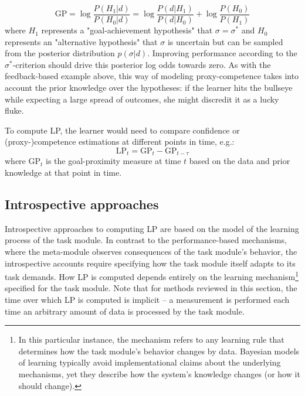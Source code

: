\begin{equation}
   \mathrm{GP} = \log \frac{P(H_1|d)}{P(H_0|d)} = \log \frac{P(d|H_1)}{P(d|H_0)} + \log \frac{P(H_0)}{P(H_1)}
\end{equation}
where $H_1$ represents a "goal-achievement hypothesis" that $\sigma = \sigma^*$ and $H_0$ represents an "alternative hypothesis" that $\sigma$ is uncertain but can be sampled from the posterior distribution $p(\sigma|d)$. Improving performance according to the $\sigma^*$-criterion should drive this posterior log odds towards zero. As with the feedback-based example above, this way of modeling proxy-competence takes into account the prior knowledge over the hypotheses: if the learner hits the bullseye while expecting a large spread of outcomes, she might discredit it as a lucky fluke. 

To compute \ac{LP}, the learner would need to compare confidence or (proxy-)competence estimations at different points in time, e.g.:
\begin{equation}
   \mathrm{LP}_t = \mathrm{GP}_{t} - \mathrm{GP}_{t-\tau}
\end{equation}
where $\mathrm{GP}_t$ is the goal-proximity measure at time $t$ based on the data and prior knowledge at that point in time.

\subsection{Introspective approaches}\label{subsec:introspective_approaches}

Introspective approaches to computing \ac{LP} are based on the model of the learning process of the task module. In contrast to the performance-based mechanisms, where the meta-module observes consequences of the task module's behavior, the introspective accounts require specifying how the task module itself adapts to its task demands. How \ac{LP} is computed depends entirely on the learning mechanism\footnote{In this particular instance, the mechanism refers to any learning rule that determines how the task module's behavior changes by data. Bayesian models of learning typically avoid implementational claims about the underlying mechanisms, yet they describe how the system's knowledge changes (or how it should change).} specified for the task module. Note that for methods reviewed in this section, the time over which \ac{LP} is computed is implicit -- a measurement is performed each time an arbitrary amount of data is processed by the task module.

